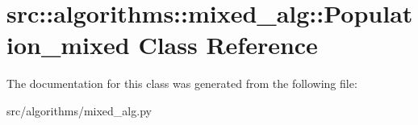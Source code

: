 \hypertarget{classsrc_1_1algorithms_1_1mixed__alg_1_1Population__mixed}{
\section{src::algorithms::mixed\_\-alg::Population\_\-mixed Class Reference}
\label{classsrc_1_1algorithms_1_1mixed__alg_1_1Population__mixed}
}


The documentation for this class was generated from the following file:\begin{DoxyCompactItemize}
\item 
src/algorithms/mixed\_\-alg.py\end{DoxyCompactItemize}
